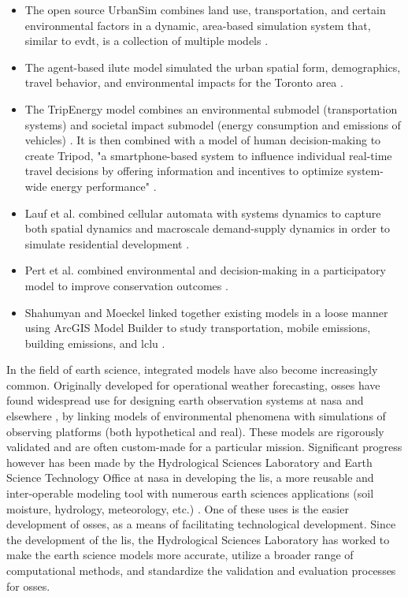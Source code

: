 \begin{itemize} \setlength{\itemsep}{0pt} \setlength{\parskip}{0pt}
	\item{The open source UrbanSim combines land use, transportation, and certain environmental factors in a dynamic, area-based simulation system that, similar to \ac{evdt}, is a collection of multiple models \cite{waddellUrbanSimModelingUrban2002}.}
	\item{The agent-based \ac{ilute} model simulated the urban spatial form, demographics, travel behavior, and environmental impacts for the Toronto area \cite{millerHistoricalValidationIntegrated2011}.}
	\item{The TripEnergy model combines an environmental submodel (transportation systems) and societal impact submodel (energy consumption and emissions of vehicles) \cite{needellEfficientlySimulatingPersonal2018}. It is then combined with a model of human decision-making to create Tripod, "a smartphone-based system to influence individual real-time travel decisions by offering information and incentives to optimize system-wide energy performance" \cite{azevedoTripodSustainableTravel2018}.}
	\item{Lauf et al. combined cellular automata with systems dynamics to capture both spatial dynamics and macroscale demand-supply dynamics in order to simulate residential development \cite{laufUncoveringLanduseDynamics2012}.}
	\item{Pert et al. combined environmental and decision-making in a participatory model to improve conservation outcomes \cite{pertParticipatoryDevelopmentNew2013}.}
	\item{Shahumyan and Moeckel linked together existing models in a loose manner using ArcGIS Model Builder to study transportation, mobile emissions, building emissions, and \ac{lclu} \cite{shahumyanIntegrationLandUse2017}.}
\end{itemize} 

In the field of earth science, integrated models have also become increasingly common. Originally developed for operational weather forecasting, \acp{osse} have found widespread use for designing earth observation systems at \ac{nasa} and elsewhere \cite{masutaniObservingSystemSimulation2010}, by linking models of environmental phenomena with simulations of observing platforms (both hypothetical and real). These models are rigorously validated \cite{erricoDevelopmentValidationObservingsystem2013} and are often custom-made for a particular mission. Significant progress however has been made by the Hydrological Sciences Laboratory and Earth Science Technology Office at \ac{nasa} in developing the \ac{lis}, a more reusable and inter-operable modeling tool with numerous earth sciences applications (soil moisture, hydrology, meteorology, etc.) \cite{kumarMissionSimulationEvaluation2015}. One of these uses is the easier development of \acp{osse}, as a means of facilitating technological development. Since the development of the \ac{lis}, the Hydrological Sciences Laboratory has worked to make the earth science models more accurate, utilize  a broader range of computational methods, and standardize the validation and evaluation processes for \acp{osse}.

